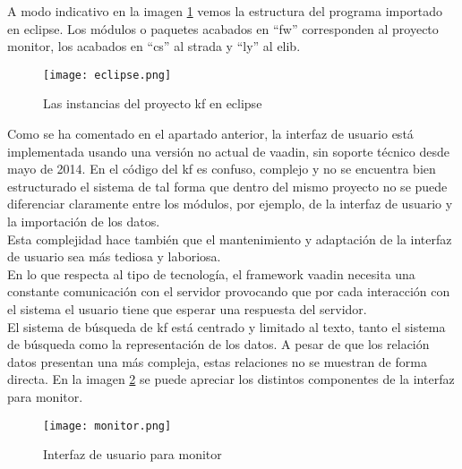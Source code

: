 \begin{itemize}
A modo indicativo en la imagen \ref{image:eclipsekf} vemos la estructura del programa importado en \gls{eclipse}. Los módulos o paquetes acabados en ``fw'' corresponden al proyecto \gls{monitor}, los acabados en ``cs'' al \gls{strada} y ``ly'' al \gls{elib}.

\begin{figure}[h!]
  \centering
    \texttt{[image: eclipse.png]}
  \caption{Las instancias del proyecto \gls{kf} en \gls{eclipse}}
  \label{image:eclipsekf}
\end{figure}

Como se ha comentado en el apartado anterior, la interfaz de usuario está implementada usando una versión no actual de \gls{vaadin}, sin soporte técnico desde mayo de 2014. En el código del \gls{kf} es confuso, complejo y no se encuentra bien estructurado el sistema de tal forma que dentro del mismo proyecto no se puede diferenciar claramente entre los módulos, por ejemplo, de la interfaz de usuario y la importación de los datos.\\

Esta complejidad hace también que el mantenimiento y adaptación de la interfaz de usuario sea más tediosa y laboriosa.\\

En lo que respecta al tipo de tecnología, el \gls{framework} \gls{vaadin} necesita una constante comunicación con el servidor provocando que por cada interacción con el sistema el usuario tiene que esperar una respuesta del servidor.\\

El sistema de búsqueda de \gls{kf} está centrado y limitado al texto, tanto el sistema de búsqueda como la representación de los datos. A pesar de que los relación datos presentan una más compleja, estas relaciones no se muestran de forma directa. En la imagen \ref{image:monitor} se puede apreciar los distintos componentes de la interfaz para \gls{monitor}.

\begin{figure}[h!]
  \centering
    \texttt{[image: monitor.png]}
  \caption{Interfaz de usuario para \gls{monitor}}
  \label{image:monitor}
\end{figure}
\end{itemize}




